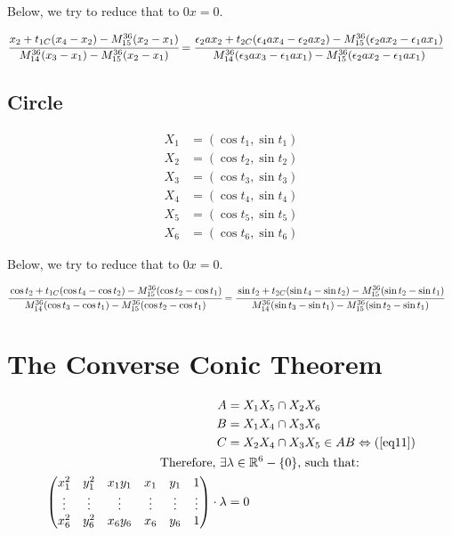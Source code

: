 \documentclass[12pt]{article}
\begin{document}
Below, we try to reduce that to $0x = 0$.

\begin{align}
\cfrac{x_2 + t_{1C} (x_4 - x_2) - M_{15}^{36}(x_2 - x_1)}{M_{14}^{36} (x_3 - x_1) - M_{15}^{36}(x_2 - x_1)} &=\cfrac{\epsilon_2 ax_2 + t_{2C} (\epsilon_4 ax_4 - \epsilon_2 ax_2) - M_{15}^{36}(\epsilon_2 ax_2 - \epsilon_1 ax_1)}{M_{14}^{36}(\epsilon_3 ax_3 - \epsilon_1 ax_1) - M_{15}^{36}(\epsilon_2 ax_2 - \epsilon_1 ax_1)}
\end{align}

\subsection{Circle}

\begin{align}
  X_1 &= (\cos t_1, \sin t_1) \\ 
  X_2 &= (\cos t_2, \sin t_2) \\ 
  X_3 &= (\cos t_3, \sin t_3) \\ 
  X_4 &= (\cos t_4, \sin t_4) \\ 
  X_5 &= (\cos t_5, \sin t_5) \\ 
  X_6 &= (\cos t_6, \sin t_6) 
\end{align}

Below, we try to reduce that to $0x = 0$.

\footnotesize

\begin{align}
\cfrac{\cos t_2 + t_{1C} (\cos t_4 - \cos t_2) - M_{15}^{36}(\cos t_2 - \cos t_1)}{M_{14}^{36} (\cos t_3 - \cos t_1) - M_{15}^{36}(\cos t_2 - \cos t_1)} &=\cfrac{\sin t_2 + t_{2C} (\sin t_4 - \sin t_2) - M_{15}^{36}(\sin t_2 - \sin t_1)}{M_{14}^{36}(\sin t_3 - \sin t_1) - M_{15}^{36}(\sin t_2 - \sin t_1)}
\end{align}

\normalsize

\newpage

\section{The Converse Conic Theorem}

\begin{align}
    A &= X_1 X_5 \cap X_2 X_6 \\
    B &= X_1 X_4 \cap X_3 X_6 \\
    C &= X_2 X_4 \cap X_3 X_5 \in AB\Leftrightarrow (\ref{eq11}) \\
    \text{Therefore, } \exists &\lambda\in\mathbb{R}^6-\{0\}\text{, such that:} \nonumber \\
    \begin{pmatrix}
        x_1^2 & y_1^2 & x_1 y_1 & x_1 & y_1 & 1 \\
        \vdots & \vdots & \vdots & \vdots & \vdots & \vdots \\
        x_6^2 & y_6^2 & x_6 y_6 & x_6 & y_6 & 1 
    \end{pmatrix}\cdot \lambda &= 0
\end{align}
\end{document}
